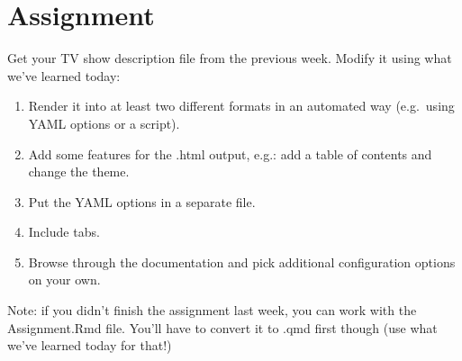 \documentclass[
  letterpaper,
  DIV=11,
  numbers=noendperiod]{scrartcl}
\begin{document}
\hypertarget{assignment}{%
\section{Assignment}\label{assignment}}

Get your TV show description file from the previous week. Modify it
using what we've learned today:

\begin{enumerate}
\def\labelenumi{\arabic{enumi})}
\item
  Render it into at least two different formats in an automated way
  (e.g.~using YAML options or a script).
\item
  Add some features for the .html output, e.g.: add a table of contents
  and change the theme.
\item
  Put the YAML options in a separate file.
\item
  Include tabs.
\item
  Browse through the documentation and pick additional configuration
  options on your own.
\end{enumerate}

Note: if you didn't finish the assignment last week, you can work with
the Assignment.Rmd file. You'll have to convert it to .qmd first though
(use what we've learned today for that!)
\end{document}
